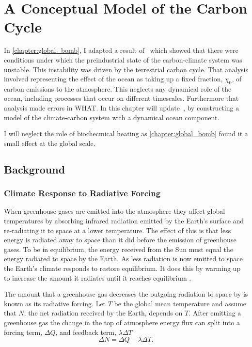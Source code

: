 \chapter{A Conceptual Model of the Carbon Cycle}
\label{chapter:conceptual_carbon_cycle}
\graphicspath{{box_ocean/figs/}}

In \cref{chapter:global_bomb}, I adapted a result of~\cite{Cox2006} which showed that there were conditions under which the preindustrial state of the carbon-climate
system was unstable. This instability was driven by the terrestrial carbon cycle. That analysis involved representing the effect of the ocean as taking up a fixed fraction,
$\chi_0$, of carbon emissions to the atmosphere. This neglects any dynamical role of the ocean, including processes that occur on different timescales. Furthermore that analysis
made errors in WHAT. In this chapter will update~\cite{Cox2006}, by constructing a model of the climate-carbon system with a dynamical ocean component.

I will neglect the role of biochecmical heating as \cref{chapter:global_bomb} found it a small effect at the global scale.

\section{Background}

\subsection{Climate Response to Radiative Forcing}
When greenhouse gases are emitted into the atmosphere they affect global temperatures
by absorbing infrared radiation emitted by the Earth's surface and re-radiating it to space at a lower temperature.
The effect of this is that less energy is radiated away to space than it did before the emission of greenhouse gases. To be in
equilibrium, the energy received from the Sun must equal the energy radiated to space by the Earth. As less radiation is now
emitted to space the Earth's climate responds to restore equilibrium. It does this by warming up to increase the amount it
radiates until it reaches equilibrium \parencite{Pierrehumbert2010}. 

The amount that a greenhouse gas decreases the outgoing radiation to space by is known as its radiative forcing. Let $T$ be
the global mean temperature and assume that $N$, the net radiation received by the Earth, depends on $T$. After emitting a greenhouse gas
the change in the top of atmosphere energy flux can split \parencite{Gregory2004} into a forcing term, $\Delta Q$, and feedback term, $\lambda \Delta T$
\begin{equation}
  \label{eq:deltaN}
  \Delta N = \Delta Q - \lambda \Delta T.
\end{equation}

